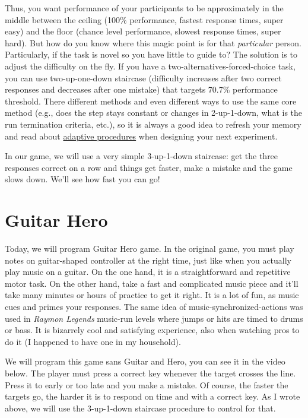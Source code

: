 \documentclass[
]{book}
\begin{document}
Thus, you want performance of your participants to be approximately in the middle between the ceiling (100\% performance, fastest response times, super easy) and the floor (chance level performance, slowest response times, super hard). But how do you know where this magic point is for that \emph{particular} person. Particularly, if the task is novel so you have little to guide to? The solution is to adjust the difficulty on the fly. If you have a two-alternatives-forced-choice task, you can use two-up-one-down staircase (difficulty increases after two correct responses and decreases after one mistake) that targets 70.7\% performance threshold. There different methods and even different ways to use the same core method (e.g., does the step stays constant or changes in 2-up-1-down, what is the run termination criteria, etc.), so it is always a good idea to refresh your memory and read about \href{https://doi.org/10.3758/BF03194543}{adaptive procedures} when designing your next experiment.

In our game, we will use a very simple 3-up-1-down staircase: get the three responses correct on a row and things get faster, make a mistake and the game slows down. We'll see how fast you can go!

\hypertarget{guitar-hero}{%
\section{Guitar Hero}\label{guitar-hero}}

Today, we will program Guitar Hero game. In the original game, you must play notes on guitar-shaped controller at the right time, just like when you actually play music on a guitar. On the one hand, it is a straightforward and repetitive motor task. On the other hand, take a fast and complicated music piece and it'll take many minutes or hours of practice to get it right. It is a lot of fun, as music cues and primes your responses. The same idea of music-synchronized-actions was used in \emph{Raymon Legends} music-run levels where jumps or hits are timed to drums or bass. It is bizarrely cool and satisfying experience, also when watching pros to do it (I happened to have one in my household).

We will program this game sans Guitar and Hero, you can see it in the video below. The player must press a correct key whenever the target crosses the line. Press it to early or too late and you make a mistake. Of course, the faster the targets go, the harder it is to respond on time and with a correct key. As I wrote above, we will use the 3-up-1-down staircase procedure to control for that.
\end{document}
